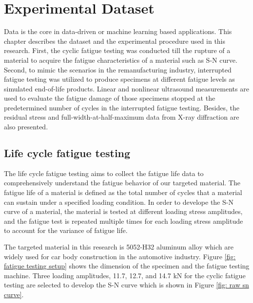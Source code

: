 \chapter{Experimental Dataset}
Data is the core in data-driven or machine learning based applications. This chapter describes the dataset and the experimental procedure used in this research. First, the cyclic fatigue testing was conducted till the rupture of a material to acquire the fatigue characteristics of a material such as S-N curve. Second, to mimic the scenarios in the remanufacturing industry, interrupted fatigue testing was utilized to produce specimens at different fatigue levels as simulated end-of-life products. Linear and nonlinear ultrasound measurements are used to evaluate the fatigue damage of those specimens stopped at the predetermined number of cycles in the interrupted fatigue testing. Besides, the residual stress and full-width-at-half-maximum data from X-ray diffraction are also presented.

\section{Life cycle fatigue testing}
The life cycle fatigue testing aims to collect the fatigue life data to comprehensively understand the fatigue behavior of our targeted material. The fatigue life of a material is defined as the total number of cycles that a material can sustain under a specified loading condition. In order to develope the S-N curve of a material, the material is tested at different loading stress amplitudes, and the fatigue test is repeated multiple times for each loading stress amplitude to account for the variance of fatigue life.

The targeted material in this research is 5052-H32 aluminum alloy which are widely used for car body construction in the automotive industry. Figure \ref{fig: fatigue testing setup} shows the dimension of the specimen and the fatigue testing machine. Three loading amplitudes, 11.7, 12.7, and 14.7 kN for the cyclic fatigue testing are selected to develop the S-N curve which is shown in Figure \ref{fig: raw sn curve}. 

